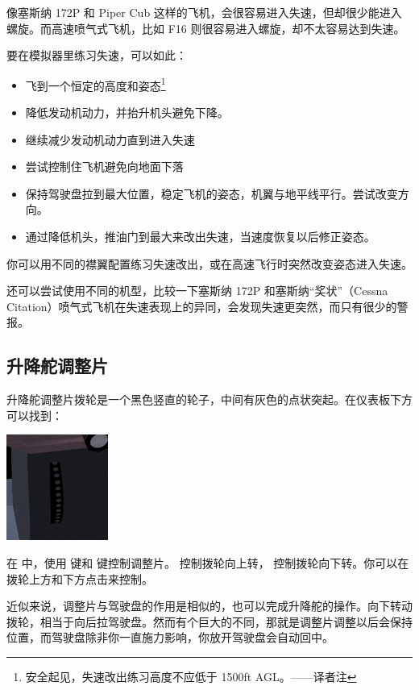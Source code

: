 像塞斯纳 172P 和 Piper Cub 这样的飞机，会很容易进入失速，但却很少能进入螺旋。而高速喷气式飞机，比如 F16 则很容易进入螺旋，却不太容易达到失速。

要在模拟器里练习失速，可以如此：
\begin{itemize}
    \item 飞到一个恒定的高度和姿态\footnote{安全起见，失速改出练习高度不应低于 1500ft AGL。——译者注}
    \item 降低发动机动力，并抬升机头避免下降。
    \item 继续减少发动机动力直到进入失速
    \item 尝试控制住飞机避免向地面下落
    \item 保持驾驶盘拉到最大位置，稳定飞机的姿态，机翼与地平线平行。尝试改变方向。
    \item 通过降低机头，推油门到最大来改出失速，当速度恢复以后修正姿态。
\end{itemize}

你可以用不同的襟翼配置练习失速改出，或在高速飞行时突然改变姿态进入失速。

还可以尝试使用不同的机型，比较一下塞斯纳 172P 和塞斯纳“奖状”（Cessna Citation）喷气式飞机在失速表现上的异同，会发现失速更突然，而只有很少的警报。

\subsection{升降舵调整片}
\label{sec:Trim}

升降舵调整片拨轮是一个黑色竖直的轮子，中间有灰色的点状突起。在仪表板下方可以找到：

\begin{center}
\includegraphics[width=0.25\textwidth]{img/tut_35}
\end{center}

在 \FlightGear{} 中，使用  键和  键控制调整片。 控制拨轮向上转，  控制拨轮向下转。你可以在拨轮上方和下方点击来控制。

近似来说，调整片与驾驶盘的作用是相似的，也可以完成升降舵的操作。向下转动拨轮，相当于向后拉驾驶盘。然而有个巨大的不同，那就是调整片调整以后会保持位置，而驾驶盘除非你一直施力影响，你放开驾驶盘会自动回中。

